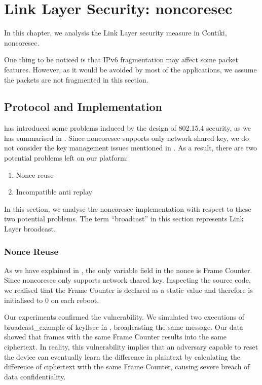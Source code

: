 \chapter{Link Layer Security: noncoresec} \label{Chp: LLSEC}

In this chapter, we analysis the Link Layer security measure in Contiki, noncoresec.

One thing to be noticed is that IPv6 fragmentation may affect some packet features. However, as it would be avoided by most of the applications, we assume the packets are not fragmented in this section.

\section{Protocol and Implementation}

\cite{802154sec} has introduced some problems induced by the design of 802.15.4 security, as we has summarised in . Since noncoresec supports only network shared key, we do not consider the key management issues mentioned in \cite{802154sec}. As a result, there are two potential problems left on our platform:

\begin{enumerate}
	\item Nonce reuse
	\item Incompatible anti replay
\end{enumerate}

In this section, we analyse the noncoresec implementation with respect to these two potential problems. The term ``broadcast'' in this section represents Link Layer broadcast.

\subsection{Nonce Reuse}

As we have explained in , the only variable field in the nonce is Frame Counter. Since noncoresec only supports network shared key. Inspecting the source code, we realised that the Frame Counter is declared as a static value and therefore is initialised to $0$ on each reboot.

Our experiments confirmed the vulnerability. We simulated two executions of  broadcast\_example of keyllsec in , broadcasting the same message. Our data\cite{NonceReuseData} showed that frames with the same Frame Counter results into the same ciphertext. In reality, this vulnerability implies that an adversary capable to reset the device can eventually learn the difference in plaintext by calculating the difference of ciphertext with the same Frame Counter, causing severe breach of data confidentiality.

